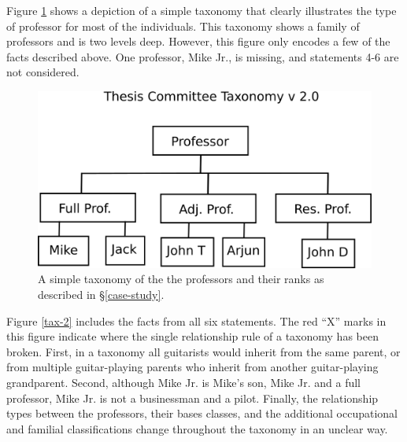 Figure \ref{tax-1} shows a depiction of a simple taxonomy that clearly
illustrates the type of professor for most of the individuals. This taxonomy
shows a family of professors and is two levels deep. However, this figure only
encodes a few of the facts described above. One professor, Mike Jr., is missing,
and statements 4-6 are not considered.

\begin{figure}[htbp]
\centering
\includegraphics[width=\textwidth]{figures/tc-tax-v2.png}
\caption{A simple taxonomy of the the professors and their ranks as described
in \S \ref{case-study}.}
\label{tax-1}
\end{figure}

Figure \ref{tax-2} includes the facts from all six statements. The red ``X''
marks in this figure indicate where the single relationship rule of a taxonomy
has been broken. First, in a taxonomy all guitarists would inherit from the same
parent, or from multiple guitar-playing parents who inherit from another
guitar-playing grandparent. Second, although Mike Jr. is Mike's son, Mike Jr.
and a full professor, Mike Jr. is not a businessman and a pilot. Finally, the
relationship types between the professors, their bases classes, and the
additional occupational and familial classifications change throughout the
taxonomy in an unclear way.

